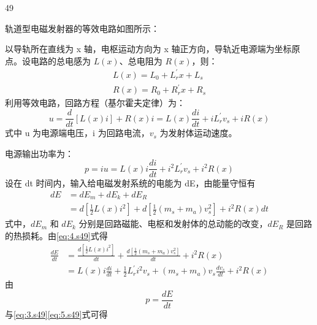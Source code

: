 \begin{solution}{49}
\begin{subsolution}
轨道型电磁发射器的等效电路如图所示：

以导轨所在直线为 x 轴，电枢运动方向为 x 轴正方向，导轨近电源端为坐标原点。设电路的总电感为 $L(x)$、总电阻为 $R(x)$，则：
\begin{equation}
\begin{array}{l}
L(x) = L_{0} + L_{r}^{\prime}x + L_{s} \\
R(x) = R_{0} + R_{r}^{\prime}x + R_{s}
\end{array}
\label{eq:1.s49}
\end{equation}
利用等效电路，回路方程（基尔霍夫定律）为：
\begin{equation}
u = \frac{d}{dt}[L(x)i] + R(x)i = L(x)\frac{di}{dt} + iL_{r}^{\prime}v_{s} + iR(x)
\label{eq:2.s49}
\end{equation}
式中 u 为电源端电压，i 为回路电流，$v_{s}$ 为发射体运动速度。
\end{subsolution}
\begin{subsolution}
电源输出功率为：
\begin{equation}
p = iu = L(x)i\frac{di}{dt} + i^{2}L_{r}^{\prime}v_{s} + i^{2}R(x)
\label{eq:3.s49}
\end{equation}
设在 dt 时间内，输入给电磁发射系统的电能为 dE，由能量守恒有
\begin{equation}
\begin{array}{rl}
dE &= dE_{m} + dE_{k} + dE_{R} \\
&= d[\frac{1}{2}L(x)i^{2}] + d[\frac{1}{2}(m_{s}+m_{a})v_{s}^{2}] + i^{2}R(x)dt
\end{array}
\label{eq:4.s49}
\end{equation}
式中，$dE_{m}$ 和 $dE_{k}$ 分别是回路磁能、电枢和发射体的总动能的改变，$dE_{R}$ 是回路的热损耗。由\eqref{eq:4.s49}式得
\begin{equation}
\begin{array}{rl}
\frac{dE}{dt} &= \frac{d[\frac{1}{2}L(x)i^{2}]}{dt} + \frac{d[\frac{1}{2}(m_{s}+m_{a})v_{s}^{2}]}{dt} + i^{2}R(x) \\
&= L(x)i\frac{di}{dt} + \frac{1}{2}L_{r}^{\prime}i^{2}v_{s} + (m_{s}+m_{a})v_{s}\frac{dv_{s}}{dt} + i^{2}R(x)
\end{array}
\label{eq:5.s49}
\end{equation}
由
\begin{equation}
p = \frac{dE}{dt}
\label{eq:6.s49}
\end{equation}
与\eqref{eq:3.s49}\eqref{eq:5.s49}式可得
\begin{equation}

\end{equation}
\end{subsolution}
\end{solution}
